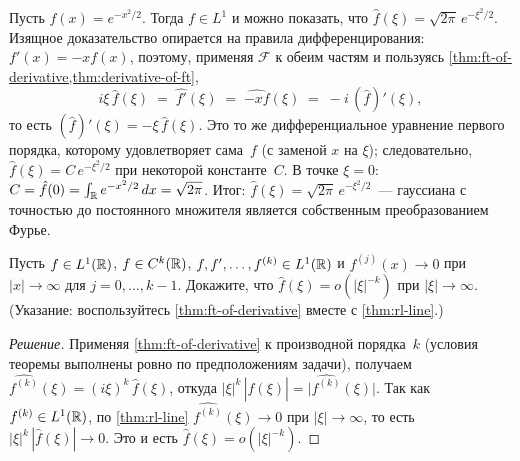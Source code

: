 \begin{example}
\label{ex:ft-gaussian}
Пусть $f(x) = e^{-x^2/2}$. Тогда $f \in L^1$ и можно показать, что
$\hat f(\xi) = \sqrt{2\pi}\, e^{-\xi^2/2}$. Изящное доказательство
опирается на правила дифференцирования: $f'(x) = -x f(x)$, поэтому,
применяя $\mathcal{F}$ к обеим частям и пользуясь
\cref{thm:ft-of-derivative,thm:derivative-of-ft},
\[
  i \xi\, \hat f(\xi) \;=\; \widehat{f'}(\xi) \;=\; \widehat{-x f}(\xi) \;=\; -i\, (\hat f)'(\xi),
\]
то есть $(\hat f)'(\xi) = -\xi\, \hat f(\xi)$. Это то же
дифференциальное уравнение первого порядка, которому удовлетворяет
сама~$f$ (с заменой $x$ на $\xi$); следовательно,
$\hat f(\xi) = C\, e^{-\xi^2/2}$ при некоторой константе~$C$.
В точке $\xi = 0$:
$C = \hat f(0) = \int_{\mathbb{R}} e^{-x^2/2}\, dx = \sqrt{2\pi}$. Итог:
$\hat f(\xi) = \sqrt{2\pi}\, e^{-\xi^2/2}$~--- гауссиана с точностью
до постоянного множителя является собственным преобразованием Фурье.
\end{example}

\begin{problem}
\label{prob:smoothness-decay}
Пусть $f \in L^1(\mathbb{R})$, $f \in C^k(\mathbb{R})$, $f, f', \dots, f^{(k)} \in L^1(\mathbb{R})$
и $f^{(j)}(x) \to 0$ при $|x| \to \infty$ для $j = 0, \dots, k - 1$.
Докажите, что $\hat f(\xi) = o(|\xi|^{-k})$ при $|\xi| \to \infty$.
(Указание: воспользуйтесь \cref{thm:ft-of-derivative} вместе с
\cref{thm:rl-line}.)
\end{problem}

\begin{proof}[Решение]
Применяя \cref{thm:ft-of-derivative} к производной порядка~$k$
(условия теоремы выполнены ровно по предположениям задачи), получаем
$\widehat{f^{(k)}}(\xi) = (i\xi)^k\, \hat f(\xi)$, откуда
$|\xi|^k\, |\hat f(\xi)| = \bigl|\widehat{f^{(k)}}(\xi)\bigr|$. Так как
$f^{(k)} \in L^1(\mathbb{R})$, по \cref{thm:rl-line}
$\widehat{f^{(k)}}(\xi) \to 0$ при $|\xi| \to \infty$, то есть
$|\xi|^k\, |\hat f(\xi)| \to 0$. Это и есть $\hat f(\xi) = o(|\xi|^{-k})$.
\end{proof}
